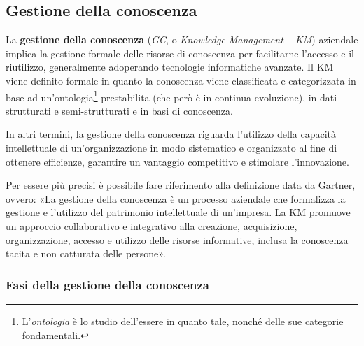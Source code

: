 \subsection{Gestione della conoscenza}

La \textbf{gestione della conoscenza} (\textit{GC}, o \textit{Knowledge Management – KM}) aziendale implica la gestione formale delle risorse di conoscenza per facilitarne l’accesso e il riutilizzo, generalmente adoperando tecnologie informatiche avanzate. Il KM viene definito formale in quanto la conoscenza viene classificata e categorizzata in base ad un’ontologia\footnote{L'\textit{ontologia} è lo studio dell'essere in quanto tale, nonché delle sue categorie fondamentali.\cite{wikipedia_ontologia}} prestabilita (che però è in continua evoluzione), in dati strutturati e semi-strutturati e in basi di conoscenza.\cite{overview_of_knowledge_management}

In altri termini, la gestione della conoscenza riguarda l’utilizzo della capacità intellettuale di un’organizzazione in modo sistematico e organizzato al fine di ottenere efficienze, garantire un vantaggio competitivo e stimolare l’innovazione.\cite{ieee_enterprise_knowledge_management}

Per essere più precisi è possibile fare riferimento alla definizione data da Gartner, ovvero: «La gestione della conoscenza è un processo aziendale che formalizza la gestione e l’utilizzo del patrimonio intellettuale di un’impresa. La KM promuove un approccio collaborativo e integrativo alla creazione, acquisizione, organizzazione, accesso e utilizzo delle risorse informative, inclusa la conoscenza tacita e non catturata delle persone».\cite{gartner_knowledge_management}

\subsubsection{Fasi della gestione della conoscenza}

